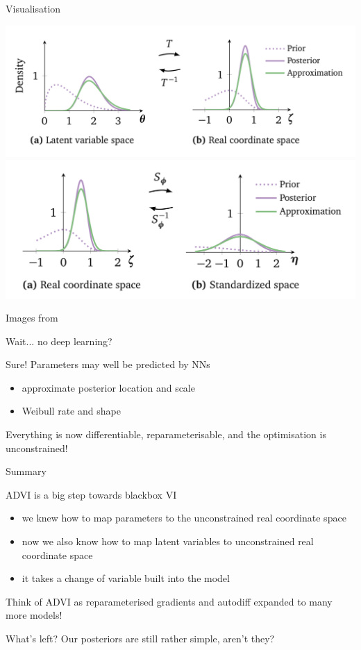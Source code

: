 \documentclass[14pt,dvipsnames]{beamer}
\begin{document}
\begin{frame}{Visualisation}

	\includegraphics[scale=0.25]{advi/t} \includegraphics[scale=0.3]{advi/s}
	
	Images from \citet{KucukelbirEtAl:2017}
\end{frame}


\begin{frame}{Wait... no deep learning?}

	Sure! Parameters may well be predicted by NNs
	
	\begin{itemize}
		\item approximate posterior location and scale
		\item Weibull rate and shape
	\end{itemize}
	
	Everything is now differentiable, reparameterisable, and the optimisation is unconstrained!
	
\end{frame}


\begin{frame}{Summary}

ADVI is a big step towards blackbox VI \pause
\begin{itemize}
	\item we knew how to map parameters to the unconstrained real coordinate space \pause
	\item now we also know how to map latent variables to unconstrained real coordinate space \pause
	\item it takes a change of variable built into the model \pause
\end{itemize}

Think of ADVI as reparameterised gradients and autodiff expanded to many more models! \pause

\alert{What's left?} \pause Our posteriors are still rather simple, aren't they?

\end{frame}


\begin{frame}[allowframebreaks]


\end{frame}
\end{document}
